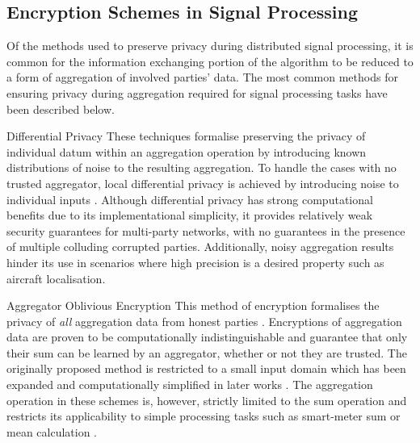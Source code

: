 \documentclass[10pt,journal,compsoc]{IEEEtran}
\theoremstyle{definition}
\theoremstyle{definition}
\theoremstyle{remark}
\begin{document}
\subsection{Encryption Schemes in Signal Processing}
Of the methods used to preserve privacy during distributed signal processing, it is common for the information exchanging portion of the algorithm to be reduced to a form of aggregation of involved parties' data. The most common methods for ensuring privacy during aggregation required for signal processing tasks have been described below.
\begin{LaTeXdescription}
    \item[Differential Privacy] These techniques formalise preserving the privacy of individual datum within an aggregation operation by introducing known distributions of noise to the resulting aggregation. To handle the cases with no trusted aggregator, local differential privacy is achieved by introducing noise to individual inputs \cite{hanPrivacyControlDynamical2018,dworkDifferentialPrivacySurvey2008,andresGeoindistinguishabilityDifferentialPrivacy2013}. Although differential privacy has strong computational benefits due to its implementational simplicity, it provides relatively weak security guarantees for multi-party networks, with no guarantees in the presence of multiple colluding corrupted parties. Additionally, noisy aggregation results hinder its use in scenarios where high precision is a desired property such as aircraft localisation.
    \item[Aggregator Oblivious Encryption] This method of encryption formalises the privacy of \textit{all} aggregation data from honest parties \cite{shiPrivacyPreservingAggregationTimeSeries2011,chanPrivacyPreservingStreamAggregation2012,joyeScalableSchemePrivacyPreserving2013}. Encryptions of aggregation data are proven to be computationally indistinguishable and guarantee that only their sum can be learned by an aggregator, whether or not they are trusted. The originally proposed method \cite{shiPrivacyPreservingAggregationTimeSeries2011} is restricted to a small input domain which has been expanded and computationally simplified in later works \cite{joyeScalableSchemePrivacyPreserving2013,benhamoudaNewFrameworkPrivacyPreserving2016}. The aggregation operation in these schemes is, however, strictly limited to the sum operation and restricts its applicability to simple processing tasks such as smart-meter sum or mean calculation \cite{chanPrivacyPreservingStreamAggregation2012,benhamoudaNewFrameworkPrivacyPreserving2016}.
\end{LaTeXdescription}
\end{document}

